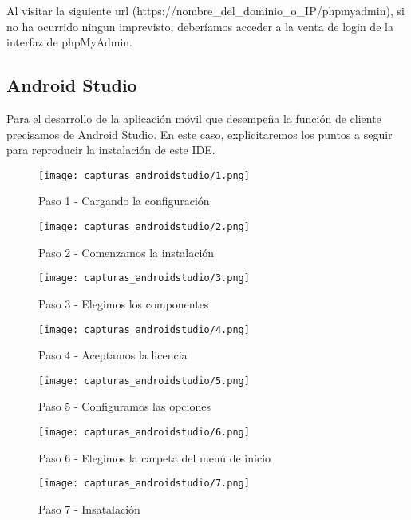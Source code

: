 \documentclass[11pt,spanish,
		listoftables,listoffigures]
		{tfgplantilla}
\begin{document}
Al visitar la siguiente url (https://nombre\_del\_dominio\_o\_IP/phpmyadmin), si no ha ocurrido ningun imprevisto, deberíamos acceder a la venta de login de la interfaz de phpMyAdmin.

\subsection {Android Studio}

Para el desarrollo de la aplicación móvil que desempeña la función de cliente precisamos de Android Studio. En este caso, explicitaremos los puntos a seguir para reproducir la instalación de este IDE.

\begin{figure}[H]
\centering
\texttt{[image: capturas\_androidstudio/1.png]}
\caption{Paso 1 - Cargando la configuración}
\end{figure}

\begin{figure}[H]
\centering
\texttt{[image: capturas\_androidstudio/2.png]}
\caption{Paso 2 - Comenzamos la instalación}
\end{figure}

\begin{figure}[H]
\centering
\texttt{[image: capturas\_androidstudio/3.png]}
\caption{Paso 3 - Elegimos los componentes}
\end{figure}

\begin{figure}[H]
\centering
\texttt{[image: capturas\_androidstudio/4.png]}
\caption{Paso 4 - Aceptamos la licencia}
\end{figure}

\begin{figure}[H]
\centering
\texttt{[image: capturas\_androidstudio/5.png]}
\caption{Paso 5 - Configuramos las opciones}
\end{figure}

\begin{figure}[H]
\centering
\texttt{[image: capturas\_androidstudio/6.png]}
\caption{Paso 6 - Elegimos la carpeta del menú de inicio}
\end{figure}

\begin{figure}[H]
\centering
\texttt{[image: capturas\_androidstudio/7.png]}
\caption{Paso 7 - Insatalación}
\end{figure}
\end{document}
